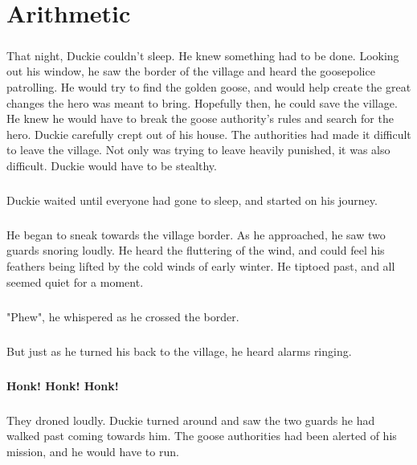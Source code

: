 \chapter{Arithmetic}
\paragraph{} That night, Duckie couldn't sleep. He knew something had to be done. Looking out his window, he saw the border of the village and heard the goosepolice patrolling. He would try to find the golden goose, and would help create the great changes the hero was meant to bring. Hopefully then, he could save the village. He knew he would have to break the goose authority's rules and search for the hero. Duckie carefully crept out of his house. The authorities had made it difficult to leave the village. Not only was trying to leave heavily punished, it was also difficult. Duckie would have to be stealthy. 
\paragraph{} Duckie waited until everyone had gone to sleep, and started on his journey.
\paragraph{} He began to sneak towards the village border. As he approached, he saw two guards snoring loudly. He heard the fluttering of the wind, and could feel his feathers being lifted by the cold winds of early winter. He tiptoed past, and all seemed quiet for a moment.
\paragraph{} "Phew", he whispered as he crossed the border. 
\paragraph{} But just as he turned his back to the village, he heard alarms ringing. 
\paragraph{} \textbf{Honk! Honk! Honk!}
\paragraph{} They droned loudly. Duckie turned around and saw the two guards he had walked past coming towards him. The goose authorities had been alerted of his mission, and he would have to run. 
